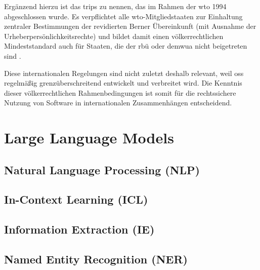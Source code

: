Ergänzend hierzu ist das \gls{trips} zu nennen, das im Rahmen der \gls{wto} 1994 abgeschlossen wurde.
Es verpflichtet alle \gls{wto}-Mitgliedstaaten zur Einhaltung zentraler Bestimmungen der revidierten Berner Übereinkunft (mit Ausnahme der Urheberpersönlichkeitsrechte) und bildet damit einen völkerrechtlichen Mindeststandard auch für Staaten, die der \gls{rbü} oder dem\gls{wua} nicht beigetreten sind \autocite{malbon_standards_2014}.

Diese internationalen Regelungen sind nicht zuletzt deshalb relevant, weil \gls{oss} regelmäßig grenzüberschreitend entwickelt und verbreitet wird.
Die Kenntnis dieser völkerrechtlichen Rahmenbedingungen ist somit für die rechtssichere Nutzung von Software in internationalen Zusammenhängen entscheidend.


\section{Large Language Models}


\subsection{Natural Language Processing (NLP)}


\subsection{In-Context Learning (ICL)}


\subsection{Information Extraction (IE)}


\subsection{Named Entity Recognition (NER)}

